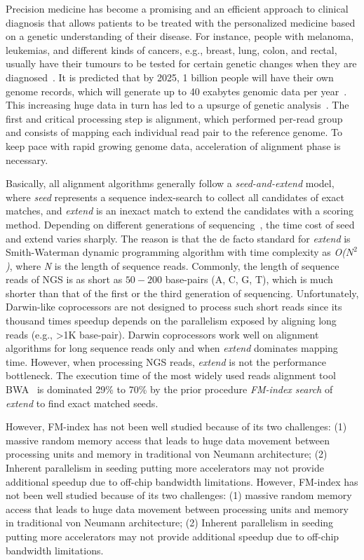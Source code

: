 \documentclass[9pt,conference]{IEEEtran}
\begin{document}
Precision medicine has become a promising and an efficient approach to clinical diagnosis that allows patients to be treated with the personalized medicine based on a genetic understanding of their disease. For instance, people with melanoma, leukemias, and different kinds of cancers, e.g., breast, lung, colon, and rectal, usually have their tumours to be tested for certain genetic changes when they are  diagnosed~\cite{shendure2008next,chang2016smem,cong2017aim}. 
It is predicted that by 2025, 1 billion people will have their own genome records, which will generate up to 40 exabytes genomic data per year~\cite{stephens2015big}. 
This increasing huge data in turn has led to a upsurge of genetic analysis~\cite{}. The first and critical processing step is alignment, which performed per-read group and consists of mapping each individual read pair to the reference genome. To keep pace with rapid growing genome data, acceleration of alignment phase is necessary.

Basically, all alignment algorithms generally follow a \textit{seed-and-extend} model, where \textit{seed} represents a sequence index-search to collect all candidates of exact matches, and \textit{extend} is an inexact match to extend the candidates with a scoring method. 
Depending on different generations of sequencing~\cite{}, the time cost of seed and extend varies sharply. 
The reason is that the de facto standard for \textit{extend} is Smith-Waterman dynamic programming algorithm with time complexity as \textit{\textit{O}($N^2$)}, where \textit{N} is the length of sequence reads. 
Commonly, the length of sequence reads of NGS is as short as $50 - 200$ base-pairs (A, C, G, T), which is much shorter than that of the first or the third generation of sequencing. 
Unfortunately, Darwin-like coprocessors are not designed to process such short reads since its thousand times speedup depends on the parallelism exposed by aligning long reads (e.g., >1K base-pair). Darwin coprocessors work well on alignment algorithms for long sequence reads only and when \textit{extend} dominates mapping time.
However, when processing NGS reads, \textit{extend} is not the performance bottleneck. 
The execution time of the most widely used reads alignment tool BWA~\cite{li2013aligning} is dominated 29\% to 70\% by the prior procedure \textit{FM-index search} of \textit{extend} to find exact matched seeds.

However, FM-index has not been well studied because of its two challenges: (1) massive random memory access that leads to huge data movement between processing units and memory in traditional von Neumann architecture; (2) Inherent parallelism in seeding putting more accelerators may not provide additional speedup due to off-chip bandwidth limitations. However, FM-index has not been well studied because of its two challenges: (1) massive random memory access that leads to huge data movement between processing units and memory in traditional von Neumann architecture; (2) Inherent parallelism in seeding putting more accelerators may not provide additional speedup due to off-chip bandwidth limitations.
\end{document}
